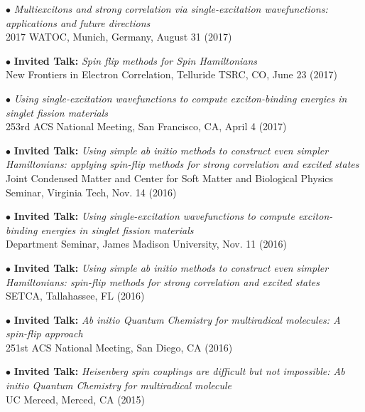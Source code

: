 \documentclass[10pt]{article}
\newenvironment{lonelist}[1][\enskip\textbullet]%
        {\vspace{-\baselineskip}\begin{list}{#1}{%
        \setlength{\partopsep}{0pt}%
        \setlength{\topsep}{0pt}}}
        {\end{list}\vspace{-.6\baselineskip}}
\begin{document}
\begin{lonelist}
\item[$\bullet$] \textit{Multiexcitons and strong correlation via single-excitation wavefunctions: applications and future directions}\\
2017 WATOC, Munich, Germany,  August 31 (2017)

\item[$\bullet$] \textbf{Invited Talk:} \textit{Spin flip methods for Spin Hamiltonians}\\
New Frontiers in Electron Correlation, Telluride TSRC, CO,  June 23 (2017)

\item[$\bullet$] \textit{Using single-excitation wavefunctions to compute exciton-binding energies in singlet fission materials}\\
253rd ACS National Meeting, San Francisco, CA, April 4 (2017)

\item[$\bullet$] \textbf{Invited Talk:} \textit{Using simple ab initio methods to construct even simpler Hamiltonians: applying spin-flip methods for strong correlation and excited states}\\
Joint Condensed Matter and Center for Soft Matter and Biological Physics Seminar, Virginia Tech, Nov. 14 (2016)

\item[$\bullet$] \textbf{Invited Talk:} \textit{Using single-excitation wavefunctions to compute exciton-binding energies in singlet fission materials}\\
Department Seminar, James Madison University, Nov. 11 (2016)

\item[$\bullet$] \textbf{Invited Talk:} \textit{Using simple ab initio methods to construct even simpler Hamiltonians: spin-flip methods for strong correlation and excited states}\\
SETCA, Tallahassee, FL (2016)

\item[$\bullet$] \textbf{Invited Talk:} \textit{Ab initio Quantum Chemistry for multiradical molecules: A spin-flip approach}\\
251st ACS National Meeting, San Diego, CA (2016)

\item[$\bullet$] \textbf{Invited Talk:} \textit{Heisenberg spin couplings are difficult but not impossible: Ab initio Quantum Chemistry for multiradical molecule}\\
UC Merced, Merced, CA (2015) 


\end{lonelist}
\end{document}

